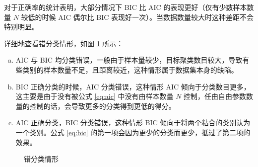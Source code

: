     对于正确率的统计表明，大部分情况下 BIC 比 AIC 的表现更好（仅有少数样本数量 $N$ 较低的时候 AIC 偶尔比 BIC 表现好一次）。当数据数量较大时这种差距不会特别明显。
    
    详细地查看错分类情形，如图 \ref{fig:false} 所示：
    \begin{enumerate}[(a)]
        \item AIC 与 BIC 均分类错误，一般由于样本量较少，目标聚类数目较大，导致有些类别的样本数量不足，且距离较近，这种情形属于数据集本身的缺陷。
        \item BIC 正确分类的时候，AIC 分类错误，这种情形 AIC 倾向于分类数目更多，这主要是由于没有被公式 \eqref{eq:aic} 中没有由样本数量 $N$ 控制，任由自由参数数量的控制的话，会导致更多的分类得到更低的得分。
        \item AIC 正确分类，BIC 分类错误，这种情形 BIC 倾向于将两个粘合的类别认为一个类别。公式 \eqref{eq:bic} 的第一项会因为更少的分类而更少，抵过了第二项的效果。
    \end{enumerate}

    \begin{figure}
        \centering
        \caption{错分类情形}\label{fig:false}
    \end{figure}

    
